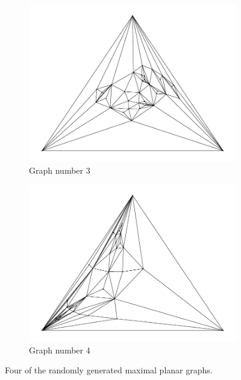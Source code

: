 \documentclass[12pt]{article}
\begin{document}
\begin{figure}[H]
\begin{subfigure}[b]{0.45\textwidth}
          \centering 
          \includegraphics[width = \textwidth]{../output/Q9-random-4012.pdf}
          \caption{Graph number 3}
      \end{subfigure}
      \hfill
      \begin{subfigure}[b]{0.45\textwidth}
          \centering 
          \includegraphics[width = \textwidth]{../output/Q9-random-4013.pdf}
          \caption{Graph number 4}
      \end{subfigure}
      \hfill
      \caption{Four of the randomly generated maximal planar graphs.}
      \label{randomplots}
  \end{figure}
\end{document}
